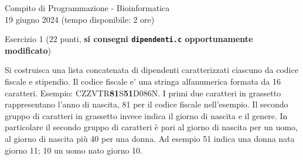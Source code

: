 \documentclass[12pt]{article}
\begin{document}
\begin{center}
  {\LARGE Compito di Programmazione - Bioinformatica}\\
  {19 giugno 2024 (tempo disponibile: 2 ore)}
\end{center}

\begin{center}
  Esercizio 1 ($22$ punti, \textbf{si consegni \texttt{dipendenti.c} opportunamente modificato})
\end{center}
Si costruisca una lista concatenata di dipendenti caratterizzati ciascuno da codice fiscale e stipendio. Il codice fiscale e' una stringa alfanumerica formata da 16 caratteri.
Esempio: CZZVTR\textbf{81}S\textbf{51}D086N.
I primi due caratteri in grassetto rappresentano l'anno di nascita, 81 per il  codice fiscale nell'esempio.
Il secondo gruppo di caratteri in grassetto invece indica il giorno di nascita e il genere.
In particolare il secondo gruppo di caratteri è pari al giorno di nascita per un uomo, al giorno di nascita più 40 per una donna. Ad esempio 51 indica una donna nata giorno 11; 10 un uomo nato giorno 10.
\end{document}
